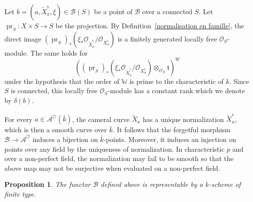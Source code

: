 \documentclass[12pt,english]{smfart}
\numberwithin{equation}{subsection}
\newtheorem{proposition}[equation]{Proposition}
\theoremstyle{remark}
\begin{document}
Let $b=(a,\widetilde X_a^\flat,\xi)\in\mathcal{B}(S)$ be a point of $\mathcal{B}$ over a connected $S$. Let $\operatorname{pr}_S:X\times S\rightarrow S$ be the projection. By Definition~\ref{normalisation en famille}, the direct image $(\operatorname{pr}_S)_*(\xi_*\mathcal{O}_{\widetilde X_a^\flat}/\mathcal{O}_{X_a^\flat})$ is a finitely generated locally free $\mathcal{O}_S$-module. The same holds for 
$$((\operatorname{pr}_S)_*(\xi_*\mathcal{O}_{\widetilde X_a^\flat}/\mathcal{O}_{X_a^\flat})\otimes_{\mathcal{O}_X} \mathfrak{t})^W$$ 
under the hypothesis that the order of $\mathbb{W}$ is prime to the characteristic of $k$. Since $S$ is connected, this locally free $\mathcal{O}_S$-module has a constant rank which we denote by $\delta(b)$.

For every $a\in\mathcal{A}^\heartsuit(\bar{k})$, the cameral curve $\widetilde X_a$ has a unique normalization $\widetilde X_a^\flat$, which is then a smooth curve over $\bar{k}$. It follows that the forgetful morphism $\mathcal{B}\rightarrow \mathcal{A}^\heartsuit$ induces a bijection on $\bar{k}$-points. Moreover, it induces an injection on points over any field by the uniqueness of normalization. In characteristic $p$ and over a non-perfect field, the normalization may fail to be smooth so that the above map may not be surjective when evaluated on a non-perfect field.

\begin{proposition}\label{representable}
The functor $\mathcal{B}$ defined above is representable by a $k$-scheme of finite type.
\end{proposition}
\end{document}
